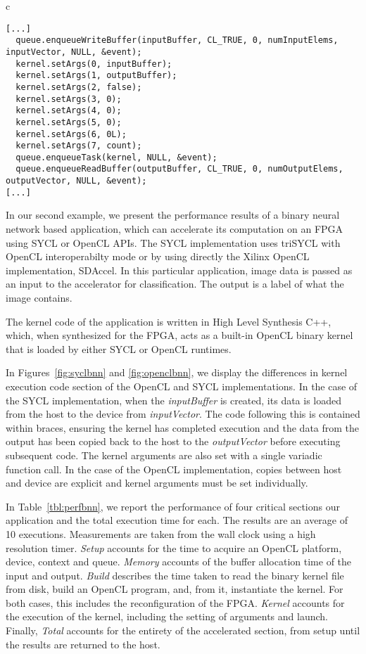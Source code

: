 \documentclass[sigplan, review, authordraft]{acmart}
\begin{document}
\begin{figure*}
  \begin{tabular}{c}
    \begin{lstlisting}[basicstyle=\scriptsize]
[...]
  queue.enqueueWriteBuffer(inputBuffer, CL_TRUE, 0, numInputElems, inputVector, NULL, &event);
  kernel.setArgs(0, inputBuffer);
  kernel.setArgs(1, outputBuffer);
  kernel.setArgs(2, false);
  kernel.setArgs(3, 0);
  kernel.setArgs(4, 0);
  kernel.setArgs(5, 0);
  kernel.setArgs(6, 0L);
  kernel.setArgs(7, count);
  queue.enqueueTask(kernel, NULL, &event);
  queue.enqueueReadBuffer(outputBuffer, CL_TRUE, 0, numOutputElems, outputVector, NULL, &event);
[...]
\end{lstlisting}
\end{tabular}
\caption{BNN kernel launch using OpenCL host API.}
\label{fig:openclbnn}
\end{figure*}


In our second example, we present the performance results of a binary
neural network based application, which can accelerate its computation
on an FPGA using SYCL or OpenCL APIs. The SYCL implementation uses
triSYCL with OpenCL interoperabilty mode or by using directly the Xilinx OpenCL implementation, SDAccel. In this particular application, image data is passed as an input to the accelerator for classification. The output is a label of what the image contains.

The kernel code of the application is written in High Level Synthesis
C++, which, when synthesized for the FPGA, acts as a built-in OpenCL
binary kernel that is loaded by either SYCL or OpenCL runtimes.

In Figures~\ref{fig:syclbnn} and \ref{fig:openclbnn}, we display the differences in kernel execution code section of the OpenCL and SYCL implementations. In the case of the SYCL implementation, when the \textit{inputBuffer} is created, its data is loaded from the host to the device from \textit{inputVector}. The code following this is contained within braces, ensuring the kernel has completed execution and the data from the output has been copied back to the host to the \textit{outputVector} before executing subsequent code. The kernel arguments are also set with a single variadic function call. In the case of the OpenCL implementation, copies between host and device are explicit and kernel arguments must be set individually. 

In Table~\ref{tbl:perfbnn}, we report the performance of four critical sections our application and the total execution time for each. The results are an average of 10 executions. Measurements are taken from the wall clock using a high resolution timer. \textit{Setup} accounts for the time to acquire an OpenCL platform, device, context and queue. \textit{Memory} accounts of the buffer allocation time of the input and output. \textit{Build} describes the time taken to read the binary kernel file from disk, build an OpenCL program, and, from it, instantiate the kernel. For both cases, this includes the reconfiguration of the FPGA. \textit{Kernel} accounts for the execution of the kernel, including the setting of arguments and launch. Finally, \textit{Total} accounts for the entirety of the accelerated section, from setup until the results are returned to the host.
\end{document}

